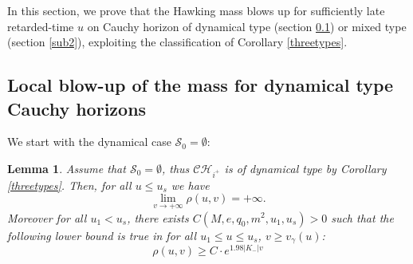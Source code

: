 \documentclass[10pt,a4paper]{article}
\theoremstyle{plain}
\newtheorem{lem}[thm]{Lemma}
\theoremstyle{remark}
\theoremstyle{definition}
\theoremstyle{plain}
\theoremstyle{remark}
\theoremstyle{definition}
\newcommand{\CH}{\mathcal{CH}_{i^+}}
\numberwithin{equation}{section}
\begin{document}
In this section, we prove that the Hawking mass blows up for sufficiently late retarded-time $u$ on Cauchy horizon of dynamical type (section \ref{sub1}) or mixed type (section \ref{sub2}), exploiting the classification of Corollary \ref{threetypes}.


\subsection{Local blow-up of the mass for dynamical type Cauchy horizons} \label{sub1}

We start with the dynamical case $\mathcal{S}_0=\emptyset$:

\begin{lem} \label{localmassblowupdynamical}
	Assume that $\mathcal{S}_0=\emptyset$, thus $\CH$ is of dynamical type by Corollary \ref{threetypes}. Then, for all $u\leq u_s$ we have $$ \lim_{v \rightarrow +\infty} \rho(u,v)=+\infty.$$
	Moreover for all $u_1<u_s$, there exists $C(M,e,q_0,m^2,u_1,u_s)>0$ such that the following lower bound is true in for all $  u_1\leq u\leq u_s$, $v \geq v_{\gamma}(u)$: \begin{equation} \label{masslowerbound}
	\rho(u,v) \geq C \cdot  e^{ 1.98 |K_-|v}
	\end{equation} %
\end{lem}
\end{document}
